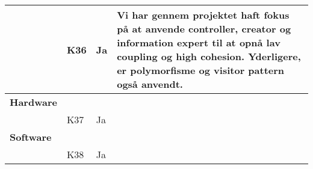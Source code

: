\documentclass[class=article, crop=false]{standalone}
\begin{document}
\begin{table}[H]
\begin{tabularx}{\textwidth}{|l|l|l|X|}
            & K36      & Ja                 & Vi har gennem projektet haft fokus på at anvende controller, creator og information expert til at opnå lav coupling og high cohesion. Yderligere, er polymorfisme og visitor pattern også anvendt. \\ \hline
            \textbf{Hardware        }&          &                    &                                                                                                                                                                                                    \\ \hline
            & K37      & Ja                 &                                                                                                                                                                                                    \\ \hline
            \textbf{Software        }&          &                    &                                                                                                                                                                                                    \\ \hline
            & K38      & Ja                 &                                                                                                                                                                                                    \\ \hline
        \end{tabularx}
    \end{table}
\end{document}
